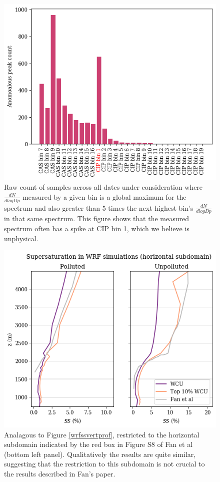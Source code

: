 \documentclass{article}
\begin{document}
\begin{figure}[ht]
	\centering
	\includegraphics[width=\textwidth]{halo/anomalous_spectrum_counts_figure.png}
	\caption{Raw count of samples across all dates under consideration where $\frac{dN}{dlogDp}$ measured by a given bin is a global maximum for the spectrum and also greater than 5 times the next highest bin's $\frac{dN}{dlogDp}$ in that same spectrum. This figure shows that the measured spectrum often has a spike at CIP bin 1, which we believe is unphysical.}
	\label{cipbin1anom}
\end{figure}

\begin{figure}[ht]
	\centering
	\includegraphics[width=\textwidth]{wrf/subdom_ss_pred_vs_z_figure.png}
	\caption{Analagous to Figure \ref{wrfssvertprof}, restricted to the horizontal subdomain indicated by the red box in Figure S8 of Fan et al (bottom left panel). Qualitatively the results are quite similar, suggesting that the restriction to this subdomain is not crucial to the results described in Fan's paper.}
	\label{wrfsubdomssvertprof}
\end{figure}
\end{document}
